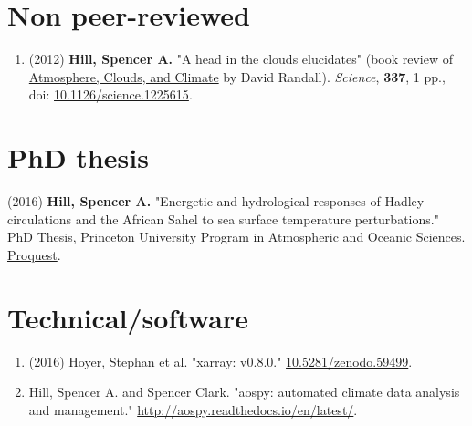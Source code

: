 \documentclass{article}
\begin{document}
\section*{Non peer-reviewed}
\label{sec:org10af3fd}
\begin{enumerate}
\item (2012) \textbf{Hill, Spencer A.} "A head in the clouds elucidates" (book review of
\href{http://press.princeton.edu/titles/9773.html}{Atmosphere, Clouds, and Climate} by David Randall). \emph{Science}, \textbf{337}, 1 pp., doi:
\href{http://dx.doi.org/10.1126/science.1225615}{10.1126/science.1225615}.
\end{enumerate}
\section*{PhD thesis}
\label{sec:org978877a}
(2016) \textbf{Hill, Spencer A.} "Energetic and hydrological responses of Hadley
circulations and the African Sahel to sea surface temperature perturbations."
PhD Thesis, Princeton University Program in Atmospheric and Oceanic Sciences.
\href{http://search.proquest.com.ezproxy.princeton.edu/pqdtglobal/docview/1831357756/abstract/522E2D42A8BF49C0PQ/1}{Proquest}.
\section*{Technical/software}
\label{sec:org5dc32ab}
\begin{enumerate}
\item (2016) Hoyer, Stephan et al.  "xarray: v0.8.0."  \href{https://doi.org/10.5281/zenodo.59499}{10.5281/zenodo.59499}.
\item Hill, Spencer A. and Spencer Clark.  "aospy: automated climate data analysis
and management."  \url{http://aospy.readthedocs.io/en/latest/}.
\end{enumerate}
\end{document}
